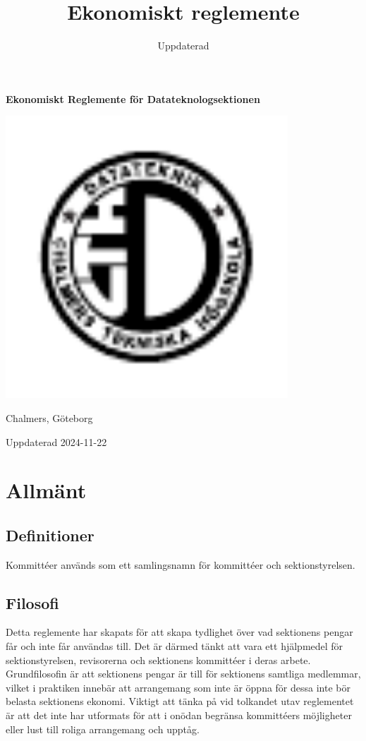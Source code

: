 \documentclass[a4paper]{dtek}
\title{Ekonomiskt reglemente}
\date{Uppdaterad \updated}
\newcommand{\updated}{2024-11-22} %
\begin{document}
\makeheadfoot%

\begin{center}
  {\Huge \textbf{Ekonomiskt Reglemente för Datateknologsektionen}}

  \includegraphics[width=300pt]{dteklogo.pdf}

  {\LARGE Chalmers, Göteborg}

  \vspace{2cm}

  {\LARGE Uppdaterad \updated}
\end{center}

\newpage
\setcounter{tocdepth}{1}
\tableofcontents
\newpage

\section{Allmänt}
\subsection{Definitioner}
Kommittéer används som ett samlingsnamn för kommittéer och sektionstyrelsen.

\subsection{Filosofi}
Detta reglemente har skapats för att skapa tydlighet över vad sektionens pengar får och inte får användas till. 
Det är därmed tänkt att vara ett hjälpmedel för sektionstyrelsen, revisorerna och sektionens kommittéer i deras arbete. 
Grundfilosofin är att sektionens pengar är till för sektionens samtliga medlemmar, vilket i praktiken innebär att arrangemang som inte är öppna för dessa inte bör belasta sektionens ekonomi. 
Viktigt att tänka på vid tolkandet utav reglementet är att det inte har utformats för att i onödan begränsa kommittéers möjligheter eller lust till roliga arrangemang och upptåg.
\end{document}
